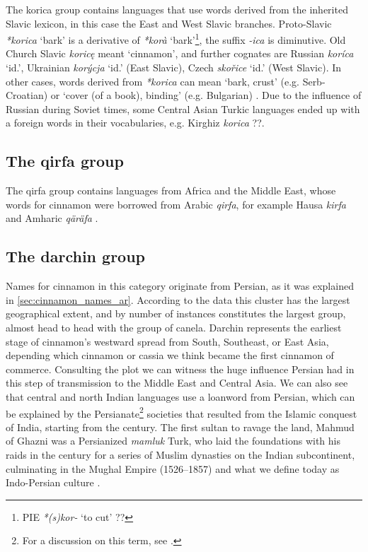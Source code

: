 The korica group contains languages that use words derived from the inherited Slavic lexicon, in this case the East and West Slavic branches. Proto-Slavic \textit{*korica} `bark' is a derivative of \textit{*korà} `bark'\footnote{\gls{PIE} \textit{*(s)kor-} `to cut' ??}, the suffix \textit{-ica} is diminutive. Old Church Slavic \textit{koricę} meant `cinnamon', and further cognates are Russian \textit{koríca} `id.', Ukrainian  \textit{korýcja} `id.' (East Slavic), Czech \textit{skořice} `id.' (West Slavic). In other cases, words derived from \textit{*korica} can mean `bark, crust' (e.g. Serb-Croatian) or `cover (of a book), binding' (e.g. Bulgarian) \parencite[235]{derksen_etymological_2008}. Due to the influence of Russian during Soviet times, some Central Asian Turkic languages ended up with a foreign words in their vocabularies, e.g. Kirghiz  \textit{korica} ??.

\subsection{The qirfa group}

The qirfa group contains languages from Africa and the Middle East, whose words for cinnamon were borrowed from Arabic \textit{qirfa}, for example Hausa \textit{kirfa} \parencite[114]{newman_hausa-english_2007} and Amharic  \textit{qäräfa} \parencite[74]{leslau_concise_1996}.

\subsection{The darchin group}

Names for cinnamon in this category originate from Persian, as it was explained in \cref{sec:cinnamon_names_ar}. According to the data this cluster has the largest geographical extent, and by number of instances constitutes the largest group, almost head to head with the group of canela. Darchin represents the earliest stage of cinnamon's westward spread from South, Southeast, or East Asia, depending which cinnamon or cassia we think became the first cinnamon of commerce. Consulting the plot we can witness the huge influence Persian had in this step of transmission to the Middle East and Central Asia. We can also see that central and north Indian languages use a loanword from Persian, which can be explained by the Persianate\footnote{For a discussion on this term, see \textcite{green_persianate_2019}.} societies that resulted from the Islamic conquest of India, starting from the  century. The first sultan to ravage the land, Mahmud of Ghazni was a Persianized \textit{mamluk} Turk, who laid the foundations with his raids in the  century for a series of Muslim dynasties on the Indian subcontinent, culminating in the Mughal Empire (1526–1857) and what we define today as Indo-Persian culture \parencite[33]{eaton_india_2019}.


